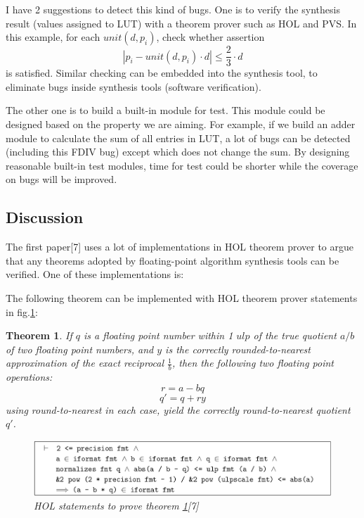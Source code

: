 \documentclass[11pt,twoside, onecolumn]{IEEEtran}
\newtheorem{Theorem}{Theorem}[section]
\begin{document}
I have 2 suggestions to detect this kind of bugs. One is to verify the synthesis result 
(values assigned to LUT) with a theorem prover such as HOL and PVS. In this example, for 
each $unit(d,p_i)$, check whether assertion 
$$|p_i - unit(d,p_i)\cdot d| \leq \frac{2}{3}\cdot d$$
is satisfied. Similar checking can be embedded into the synthesis tool, to eliminate bugs
inside synthesis tools (software verification).

The other one is to build a built-in module for test. This module could be designed based on 
the property we are aiming. For example, if we build an adder module to calculate 
the sum of all entries in LUT, a lot of bugs can be detected (including this FDIV bug)
except which does not change the sum. By designing reasonable built-in test modules,
time for test could be shorter while the coverage on bugs will be improved.

\subsection{Discussion}
The first paper[7] uses a lot of implementations in HOL theorem prover to argue that any theorems
adopted by floating-point algorithm synthesis tools can be verified. One of these implementations
is:

The following theorem can be implemented with HOL theorem prover statements in fig.\ref{fig:HOL}:
\begin{Theorem}
\label{alg:HOL}
If $q$ is a floating point number within 1 $ulp$ of the true quotient $a/b$ of two floating point
numbers, and $y$ is the correctly rounded-to-nearest approximation of the exact reciprocal $\frac{1}{b}$,
then the following two floating point operations:
$$r = a - bq$$
$$q' = q+ry$$
using round-to-nearest in each case, yield the correctly round-to-nearest quotient $q'$.
 \begin{figure}[hbt]
	\begin{center}
	\includegraphics[scale=0.6]{HOL.png}
	\end{center}
	\caption{HOL statements to prove theorem \ref{alg:HOL}[7]}
	\label{fig:HOL}
\end{figure}
\end{Theorem}
\end{document}
